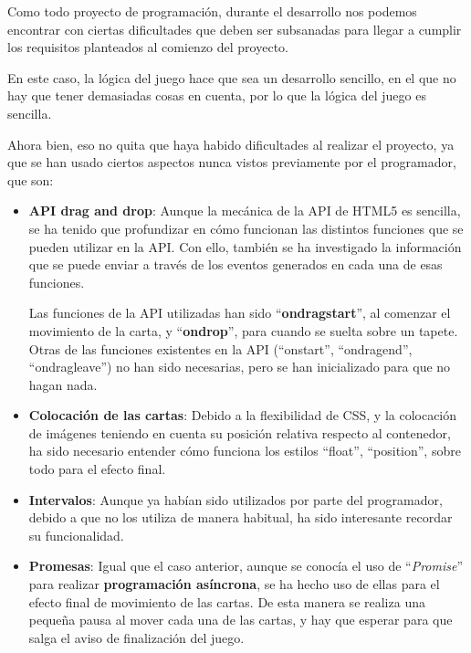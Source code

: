 \documentclass{\ClassPath/viu-tfm-template}
\begin{document}
Como todo proyecto de programación, durante el desarrollo nos podemos encontrar con ciertas dificultades que deben ser subsanadas para llegar a cumplir los requisitos planteados al comienzo del proyecto.

En este caso, la lógica del juego hace que sea un desarrollo sencillo, en el que no hay que tener demasiadas cosas en cuenta, por lo que la lógica del juego es sencilla.

Ahora bien, eso no quita que haya habido dificultades al realizar el proyecto, ya que se han usado ciertos aspectos nunca vistos previamente por el programador, que son:

\begin{itemize}
    \item \textbf{API drag and drop}: Aunque la mecánica de la API de HTML5 es sencilla, se ha tenido que profundizar en cómo funcionan las distintos funciones que se pueden utilizar en la API. Con ello, también se ha investigado la información que se puede enviar a través de los eventos generados en cada una de esas funciones.

    Las funciones de la API utilizadas han sido “\textbf{ondragstart}”, al comenzar el movimiento de la carta, y “\textbf{ondrop}”, para cuando se suelta sobre un tapete. Otras de las funciones existentes en la API (“onstart”, “ondragend”, “ondragleave”) no han sido necesarias, pero se han inicializado para que no hagan nada.

    \item \textbf{Colocación de las cartas}: Debido a la flexibilidad de CSS, y la colocación de imágenes teniendo en cuenta su posición relativa respecto al contenedor, ha sido necesario entender cómo funciona los estilos “float”, “position”, sobre todo para el efecto final.

    \item \textbf{Intervalos}: Aunque ya habían sido utilizados por parte del programador, debido a que no los utiliza de manera habitual, ha sido interesante recordar su funcionalidad.

    \item \textbf{Promesas}: Igual que el caso anterior, aunque se conocía el uso de “\textit{Promise}” para realizar \textbf{programación asíncrona}, se ha hecho uso de ellas para el efecto final de movimiento de las cartas. De esta manera se realiza una pequeña pausa al mover cada una de las cartas, y hay que esperar para que salga el aviso de finalización del juego.
\end{itemize}
\end{document}
